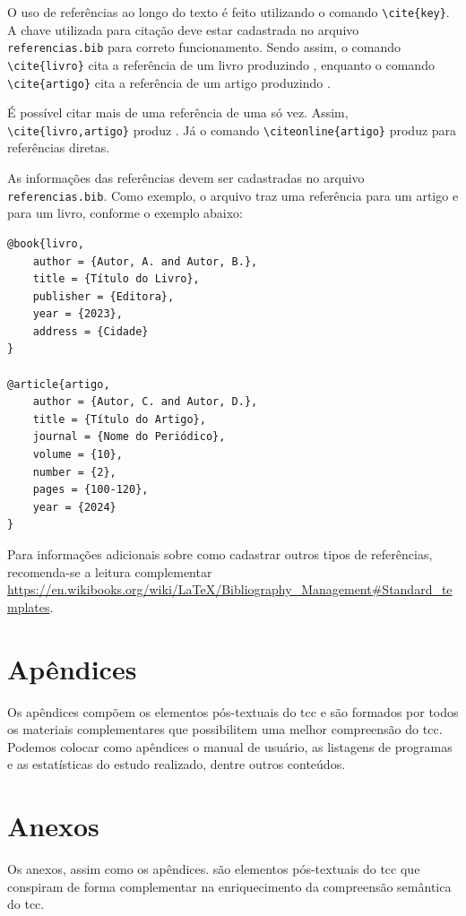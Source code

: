 \documentclass{eic-bcc-tcc}
\begin{document}
O uso de referências ao longo do texto é feito utilizando o comando \verb|\cite{key}|. A chave utilizada para citação deve estar cadastrada no arquivo \texttt{referencias.bib} para correto funcionamento. Sendo assim, o comando \verb|\cite{livro}| cita a referência de um livro produzindo \cite{livro}, enquanto o comando \verb|\cite{artigo}| cita a referência de um artigo produzindo \cite{artigo}.

É possível citar mais de uma referência de uma só vez. Assim, \verb|\cite{livro,artigo}| produz \cite{livro,artigo}. Já o comando \verb|\citeonline{artigo}| produz  para referências diretas.

As informações das referências devem ser cadastradas no arquivo \texttt{referencias.bib}. Como exemplo, o arquivo traz uma referência para um artigo e para um livro, conforme o exemplo abaixo:
\begin{verbatim}
@book{livro,
    author = {Autor, A. and Autor, B.},
    title = {Título do Livro},
    publisher = {Editora},
    year = {2023},
    address = {Cidade}
}

@article{artigo,
    author = {Autor, C. and Autor, D.},
    title = {Título do Artigo},
    journal = {Nome do Periódico},
    volume = {10},
    number = {2},
    pages = {100-120},
    year = {2024}
}
\end{verbatim}

Para informações adicionais sobre como cadastrar outros tipos de referências, recomenda-se a leitura complementar \url{https://en.wikibooks.org/wiki/LaTeX/Bibliography_Management#Standard_templates}.


\section{Apêndices}

Os apêndices compõem os elementos pós-textuais do \gls{tcc} e são formados por todos os materiais complementares que possibilitem uma melhor compreensão do \gls{tcc}. Podemos colocar como apêndices o manual de usuário, as listagens de programas e as estatísticas do estudo realizado, dentre outros conteúdos.

\section{Anexos}

Os anexos, assim como os apêndices. são elementos pós-textuais do \gls{tcc} que conspiram de forma complementar na enriquecimento da compreensão semântica do \gls{tcc}.
\end{document}
